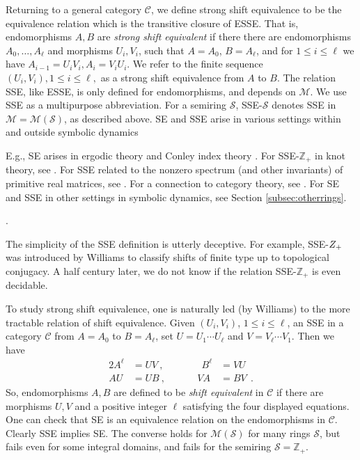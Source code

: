 \documentclass{amsart}
\newcommand{\si}{\index}
\newcommand{\ai}{\index[authors]}
\theoremstyle{definition}
\theoremstyle{definition}
\newcommand{\Z}{\mathbb Z}
\numberwithin{equation}{subsection}
\begin{document}
Returning to a general category $\mathcal C$,
we define strong shift equivalence to be the equivalence
relation which is the transitive closure of ESSE.
That is, endomorphisms $A,B$ are {\it strong shift equivalent} if there
there are endomorphisms  $A_0, \dots , A_{\ell}$
and morphisms $U_i, V_i$,
such that
$A=A_0$, $B=A_{\ell}$,   and for $1 \leq  i  \leq \ell$
we have
$A_{i-1}=U_iV_i, A_{i}=
V_iU_i$. We refer to the
finite sequence $(U_i, V_i), 1\leq i \leq \ell,$ as  a
strong shift equivalence from $A$ to $B$.
The relation SSE, like ESSE,
is only defined for endomorphisms, and depends on
$\mathcal M$.
We use SSE\si{SSE}  as
a multipurpose abbreviation.
For a semiring $\mathcal S$, SSE-$\mathcal S$ denotes
SSE in
$\mathcal M = \mathcal M(\mathcal S)$, as described above.
SE and SSE arise in   various   settings
within
and outside
symbolic dynamics
\begin{footnote}
  {E.g., SE arises in ergodic theory
 \cite{LinRudolph}
    and Conley index theory
\cite{MischaikowWeibel2023}. 
    For SSE-$\Z_+$ in knot theory,
  see \cite{Gilmer1999,SilverWilliams1999}.
  For SSE related to the nonzero spectrum (and other invariants)
  of primitive real matrices, see
  \cite{BH91,BKR2013}.
For  a connection to category theory,
see \cite{jeandel}.
 For SE and SSE in other settings in symbolic dynamics, see
 Section \ref{subsec:otherrings}.}\end{footnote}.

The simplicity of the  SSE definition
is utterly deceptive.
For example,
SSE-$\mathcal \Z_+$
was introduced by Williams\ai{Williams, R.F.}
to classify shifts of finite type
up to topological conjugacy.
A half century later, we do not
know if the relation SSE-$\Z_+$
is even decidable.


   To study strong shift equivalence,
   one is naturally led (by Williams) to the  more tractable
   relation of shift equivalence.
   Given  $(U_i,V_i)$, $1 \leq i \leq \ell$, an SSE in
   a category $\mathcal C$ from
   $A=A_0$ to $B=A_{\ell}$, set  $U=U_1 \cdots U_{\ell }$
   and $V= V_{\ell }\cdots V_1 $. Then we have
     \begin{alignat*}{2}
       A^{\ell} &= UV\ ,  & \ \ \quad  B^{\ell} &= VU \\
       AU &=UB\ ,      \ \  \quad  &\quad    VA &= BV  \ \ .
     \end{alignat*}
     So,  endomorphisms $A,B$ are defined to be {\it shift equivalent}
     in $\mathcal C$
     if there are morphisms $U,V$ and a positive integer $\ell$
     satisfying the four displayed equations.
     One can check that SE is an equivalence relation on the endomorphisms
     in $\mathcal C$.
     Clearly SSE implies SE.
     The converse holds for $\mathcal M(\mathcal S)$ for many
     rings $\mathcal S$, but fails even for some integral domains,
     and fails for the semiring $\mathcal S=\Z_+$.
\end{document}

